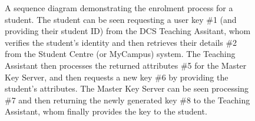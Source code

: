 \begin{appendices}
\begin{figure}
    \caption{A sequence diagram demonstrating the enrolment process for a student. The student can be seen requesting a user key \#1 (and providing their student ID) from the DCS Teaching Assitant, whom verifies the student's identity and then retrieves their details \#2 from the Student Centre (or MyCampus) system. The Teaching Assistant then processes the returned attributes \#5 for the Master Key Server, and then requests a new key \#6 by providing the student's attributes. The Master Key Server can be seen processing \#7 and then returning the newly generated key \#8 to the Teaching Assistant, whom finally provides the key to the student.}

\end{figure}

\end{appendices}
